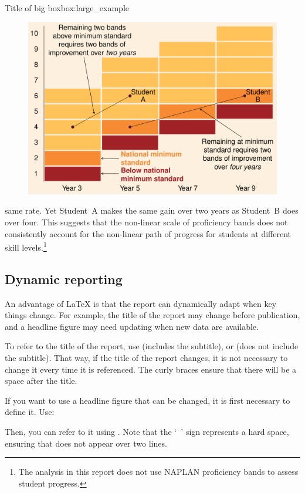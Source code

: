 \begin{bigbox}{Title of big box}{box:large_example}
\begin{figure}[H]
 \includegraphics[page=1]{atlas/NPB.pdf}\label{fig:NPB}

\end{figure}
\vspace{-10pt}
 same rate. Yet Student~A makes the same gain over two years as Student~B does over four. This suggests that the non-linear scale of proficiency bands does not consistently account for the non-linear path of progress for students at different skill levels.\footnote{The analysis in this report does not use NAPLAN proficiency bands to assess student progress.}

\end{bigbox}

\subsection{Dynamic reporting}

An advantage of \LaTeX{} is that the report can dynamically adapt when key things change. For example, the title of the report may change before publication, and a headline figure may need updating when new data are available.

To refer to the title of the report, use \fulltitle{} (includes the subtitle), or \mytitle{} (does not include the subtitle). That way, if the title of the report changes, it is not necessary to change it every time it is referenced. The curly braces ensure that there will be a space after the title.

If you want to use a headline figure that can be changed, it is first necessary to define it. Use:


Then, you can refer to it using \headline{}. Note that the `~' sign represents a hard space, ensuring that \headline{} does not appear over two lines.